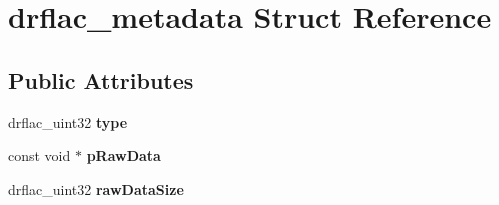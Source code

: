 \hypertarget{structdrflac__metadata}{\section{drflac\-\_\-metadata Struct Reference}
\label{structdrflac__metadata}
}
\subsection*{Public Attributes}
\begin{DoxyCompactItemize}
\item 
\hypertarget{structdrflac__metadata_aa0eb90e626e17637ea5f8accae56a160}{drflac\-\_\-uint32 {\bfseries type}}\label{structdrflac__metadata_aa0eb90e626e17637ea5f8accae56a160}

\item 
\hypertarget{structdrflac__metadata_a418724938d0f9a4a904ebaf539b9a952}{const void $\ast$ {\bfseries p\-Raw\-Data}}\label{structdrflac__metadata_a418724938d0f9a4a904ebaf539b9a952}

\item 
\hypertarget{structdrflac__metadata_a19b1921b30f4330c3b4cabb355e9df81}{drflac\-\_\-uint32 {\bfseries raw\-Data\-Size}}\label{structdrflac__metadata_a19b1921b30f4330c3b4cabb355e9df81}


\end{DoxyCompactItemize}
